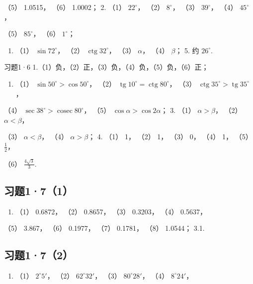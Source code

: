 （5） 1.0515， （6） 1.0002； 2. （1） \(22^{\circ}\)， （2）
\(8^{\circ}\)， （3） \(39^{\circ}\)， （4） \(45^{\circ}\)，

（5） \(85^{\circ}\)， （6） \(1^{\circ}\)；

\begin{enumerate}[start=4]
\item
  （1） \(\sin 72^{\circ}\)， （2） \(\operatorname{ctg} 32^{\circ}\)，
  （3） \(\alpha\)， （4） \(\beta\)； 5. 约 \(26^{\circ}\).
\end{enumerate}

习题1·6 1.（1）负，（2）正，（3）负，（4）负，（5）负，（6）正；

\begin{enumerate}[start=2]
\item
  （1） \(\sin 50^{\circ} > \cos 50^{\circ}\)， （2）
  \(\operatorname{tg} 10^{\circ} = \operatorname{ctg} 80^{\circ}\)，
  （3）
  \(\operatorname{ctg} 35^{\circ} > \operatorname{tg} 35^{\circ}\)，
\end{enumerate}

（4） \(\sec 38^{\circ} > \operatorname{cosec} 80^{\circ}\)， （5）
\(\cos \alpha > \cos 2\alpha\)； 3. （1） \(\alpha > \beta\)， （2）
\(\alpha < \beta\)，

（3） \(\alpha < \beta\)， （4） \(\alpha > \beta\)； 4. （1） 1， （2）
1， （3） 0， （4） 1， （5） \(\frac{1}{2}\)，

（6） \(\frac{4\sqrt{3}}{3}\).

\subsection{习题1·7（1）}

\begin{enumerate}
\item
  （1） 0.6872， （2） 0.8657， （3） 0.3203， （4） 0.5637，
\end{enumerate}

（5） 3.867， （6） 0.1977， （7） 0.1781， （8） 1.0544； 3.1.

\subsection{习题1·7（2）}

\begin{enumerate}
\item
  （1） \(2^{\circ}5'\)， （2） \(62^{\circ}32'\)， （3）
  \(80^{\circ}28'\)， （4） \(8^{\circ}24'\)，
\end{enumerate}

